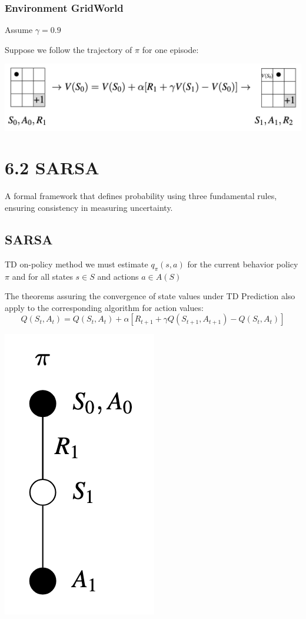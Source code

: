 \documentclass[
  letterpaper,
  DIV=11,
  numbers=noendperiod]{scrreprt}
\begin{document}
\subsection{Environment GridWorld}\label{environment-gridworld-5}

Assume \(\gamma = 0.9\)

Suppose we follow the trajectory of \(\pi\) for one episode:

\begin{center}
\includegraphics[width=0.65\linewidth,height=\textheight,keepaspectratio]{lecture6/images/GridWorldTD-Prediction.png}
\end{center}

\chapter{6.2 SARSA}\label{sarsa}

\begin{tcolorbox}[enhanced jigsaw, colback=white, left=2mm, breakable, opacityback=0, bottomrule=.15mm, rightrule=.15mm, arc=.35mm, colframe=quarto-callout-note-color-frame, leftrule=.75mm, toprule=.15mm]

A formal framework that defines probability using three fundamental
rules, ensuring consistency in measuring uncertainty. 🎲

\end{tcolorbox}

\section{SARSA}\label{sarsa-1}

TD on-policy method we must estimate \(q_{\pi}(s, a)\) for the current
behavior policy \(\pi\) and for all states \(s \in S\) and actions
\(a \in A(S)\)

The theorems assuring the convergence of state values under TD
Prediction also apply to the corresponding algorithm for action values:
\[
Q(S_{t},A_{t}) = Q(S_{t},A_{t}) + \alpha [ R_{t+1} + \gamma Q(S_{t+1},A_{t+1}) - Q(S_{t},A_{t})]
\]

\begin{center}
\includegraphics[width=0.11\linewidth,height=\textheight,keepaspectratio]{lecture6/images/SARSA.png}
\end{center}
\end{document}
